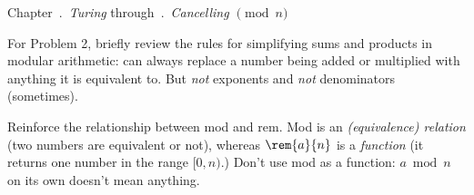 \documentclass[handout]{mcs}
\begin{document}


\begin{staffnotes}
Chapter~.\ \emph{Turing}
through~.\ \emph{Cancelling $\pmod{n}$}
\end{staffnotes}




\begin{staffnotes}
  For Problem 2, briefly review the rules for simplifying sums and products in modular arithmetic: can always replace a number being added or multiplied with anything it is equivalent to. But \emph{not} exponents and \emph{not} denominators (sometimes).
\end{staffnotes}
\begin{staffnotes}
  Reinforce the relationship between mod and rem. Mod is an \emph{(equivalence) relation} (two numbers are equivalent or not), whereas $\rem{a}{n}$ is a \emph{function} (it returns one number in the range $[0,n)$.) Don't use mod as a function: $a\bmod n$ on its own doesn't mean anything.
\end{staffnotes}














\end{document}
